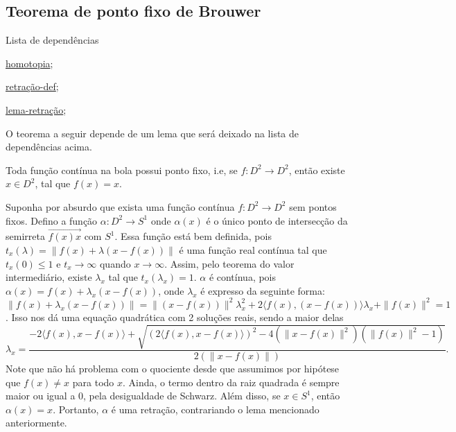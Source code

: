 \subsection{Teorema de ponto fixo de Brouwer} %
\label{teo-ponto-fixo-brower}
\begin{titlemize}{Lista de dependências}
	\item \hyperref[homotopia]{homotopia};\\ %
	\item \hyperref[retração-def]{retração-def};\\
    \item \hyperref[lema-retração]{lema-retração};\\
\end{titlemize}
O teorema a seguir depende de um lema que será deixado na lista de dependências acima.
\begin{thm}[Teorema do Ponto Fixo de Brower]%
	Toda função contínua na bola possui ponto fixo, i.e, se $f:D^2 \longrightarrow D^2$, então existe $x \in D^2$, tal que $f(x) = x$.
\end{thm}

\begin{dem}
    Suponha por absurdo que exista uma função contínua $f:D^2 \longrightarrow D^2$ sem pontos fixos. Defino a função $\alpha: D^2 \longrightarrow S^1$ onde $\alpha(x)$ é o único ponto de intersecção da semirreta $\overrightarrow{f(x)x}$ com $S^1$. Essa função está bem definida, pois $t_x(\lambda) = \|f(x) + \lambda(x - f(x))\|$ é uma função real contínua tal que $t_x(0) \leq 1$ e $t_x \to \infty$ quando $x \to \infty$. Assim, pelo teorema do valor intermediário, existe $\lambda_x$ tal que $t_x(\lambda_x) = 1$. $\alpha$ é contínua, pois $\alpha(x) = f(x) + \lambda_x(x - f(x))$, onde $\lambda_x$ é expresso da seguinte forma:
    $\|f(x) + \lambda_x(x - f(x))\| = \|(x - f(x))\|^2\lambda_x^2 + 2\langle f(x), (x - f(x)) \rangle\lambda_x + \|f(x)\|^2 = 1$. Isso nos dá uma equação quadrática com 2 soluções reais, sendo a maior delas $$\lambda_x = \frac{-2\langle f(x), x - f(x)\rangle + \sqrt{(2\langle f(x), x - f(x)\rangle)^2 - 4(\|x - f(x)\|^2)(\|f(x)\|^2 - 1)}}{2(\|x - f(x)\|)}.$$ Note que não há problema com o quociente desde que assumimos por hipótese que $f(x) \ne x$ para todo $x$. Ainda, o termo dentro da raiz quadrada é sempre maior ou igual a 0, pela desigualdade de Schwarz. Além disso, se $x \in S^1$, então $\alpha(x) = x$. Portanto, $\alpha$ é uma retração, contrariando o lema mencionado anteriormente.

\end{dem}

